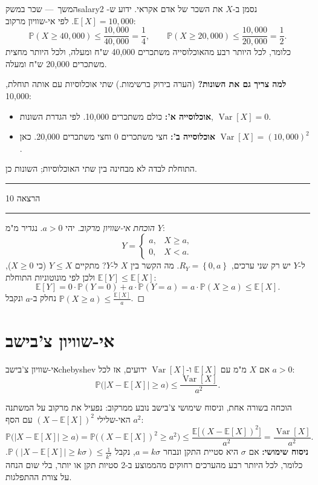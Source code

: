 \documentclass[11pt,a4paper]{report}
\newcommand{\flag}{\tikz[baseline=-0.1ex,x=0.9ex,y=0.9ex]{\draw[line width=0.5pt] (0,-0.3)--(0,1.6); \fill (0,1.6)--(1.2,1.2)--(0,0.8)--cycle;}}
\newcounter{todo}
\newcommand{\addtodo}[1]{\refstepcounter{todo}%
  \addcontentsline{tdo}{todo}{\protect\numberline{\thetodo}#1}}
\newcommand{\needcheck}[1]{\addtodo{#1}%
  {\color{todoc}\sffamily\small\,[\textbf{\flag{}\,\thetodo\ לבדיקה:} #1]\,}}
\renewcommand{\needcheck}[1]{}
\newcommand{\set}[1]{\left\{#1\right\}}
\newcommand{\PP}{\mathbb{P}}
\newcommand{\E}{\mathbb{E}}
\DeclareMathOperator{\Var}{Var}
\newcommand{\dash}{{\rmfamily —}}
\newcommand{\lecture}[1]{\par\medskip
  \begin{center}\color{exc}\sffamily\small
  \rule[0.5ex]{0.25\linewidth}{0.4pt}\quad הרצאה #1\quad\rule[0.5ex]{0.25\linewidth}{0.4pt}
  \end{center}\par}
\begin{document}
\begin{example}{המשך~\dash{} שכר במשק}{salary2}
נסמן ב-$X$ את השכר של אדם אקראי. ידוע ש-$\E[X]=10{,}000$. לפי אי-שוויון מרקוב:
\[
  \PP(X\ge40{,}000)\le\frac{10{,}000}{40{,}000}=\frac14,\qquad
  \PP(X\ge20{,}000)\le\frac{10{,}000}{20{,}000}=\frac12.
\]
כלומר, לכל היותר רבע מהאוכלוסייה משתכרים 40,000 ש"ח ומעלה, ולכל היותר מחצית משתכרים 20,000 ש"ח ומעלה.
\needcheck{ברשימות המספרים 40,000 ו-$\frac14$ נמחקו ותוקנו בירוק ל-20,000 ו-$\frac12$ ("50\%"). הצגתי את שתי הגרסאות}

\textbf{למה צריך גם את השונות?} (הערה בירוק ברשימות.) שתי אוכלוסיות עם אותה תוחלת, 10,000:
\begin{itemize}
  \item \textbf{אוכלוסייה א':} כולם משתכרים 10,000. לפי הגדרת השונות, $\Var[X]=0$.
  \item \textbf{אוכלוסייה ב':} חצי משתכרים 0 וחצי משתכרים 20,000. כאן $\Var[X]=(10{,}000)^2$.
\end{itemize}
התוחלת לבדה לא מבחינה בין שתי האוכלוסיות; השונות כן.
\end{example}

\lecture{10}

\begin{proof}[הוכחת אי-שוויון מרקוב]
יהי $a>0$. נגדיר מ"מ $Y$:
\[
  Y=\begin{cases}a, & X\ge a,\\ 0, & X<a.\end{cases}
\]
ל-$Y$ יש רק שני ערכים, $R_Y=\set{0,a}$. מה הקשר בין $X$ ל-$Y$? מתקיים $Y\le X$ (כי $X\ge0$), ולכן לפי מונוטוניות התוחלת $\E[Y]\le\E[X]$:
\[
  \E[Y]=0\cdot\PP(Y=0)+a\cdot\PP(Y=a)=a\cdot\PP(X\ge a)\le\E[X].
\]
נחלק ב-$a$ ונקבל $\PP(X\ge a)\le\frac{\E[X]}a$.
\end{proof}

\section{אי-שוויון צ'בישב}

\begin{theorem}{אי-שוויון צ'בישב}{chebyshev}
אם $X$ מ"מ עם $\E[X]$ ו-$\Var[X]$ ידועים, אז לכל $a>0$:
\[
  \PP\big(|X-\E[X]|\ge a\big)\le\frac{\Var[X]}{a^2}.
\]
\end{theorem}
\needcheck{ברשימות המכנה נכתב $x^2$; תיקנתי ל-$a^2$}

\begin{suggestion}{הוכחה בשורה אחת, וניסוח שימושי}
צ'בישב נובע ממרקוב: נפעיל את מרקוב על המשתנה האי-שלילי $(X-\E[X])^2$ עם הסף $a^2$:
\[
  \PP\big(|X-\E[X]|\ge a\big)=\PP\big((X-\E[X])^2\ge a^2\big)\le\frac{\E\big[(X-\E[X])^2\big]}{a^2}=\frac{\Var[X]}{a^2}.
\]
\textbf{ניסוח שימושי:} אם $\sigma$ היא סטיית התקן ונבחר $a=k\sigma$, נקבל $\PP(|X-\E[X]|\ge k\sigma)\le\frac1{k^2}$. כלומר, לכל היותר רבע מהערכים רחוקים מהממוצע ב-2 סטיות תקן או יותר, בלי שום הנחה על צורת ההתפלגות.
\end{suggestion}
\end{document}
